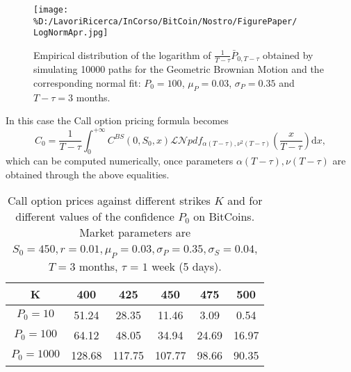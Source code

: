 \documentclass[12pt,centertags,reqno]{amsart}
\numberwithin{equation}{section} \makeatletter
\newcommand{\ud}{\mathrm d}
\begin{document}
\begin{figure}[htbp]
\texttt{[image: \%D:/LavoriRicerca/InCorso/BitCoin/Nostro/FigurePaper/
LogNormApr.jpg]} 
\caption{Empirical distribution of the logarithm of $\frac{1}{T-\tau} \bar{P}_{0,T-\tau}$  obtained by simulating 10000 paths for the Geometric Brownian Motion and the corresponding normal fit: $P_0=100$, $\mu_P=0.03$, $\sigma_P=0.35$ and  $T-\tau=3$ months. }\label{LNhistfit}
\end{figure}

In this case the Call option pricing formula becomes
\begin{equation}
C_0 = \frac{1}{T-\tau} \int_0^{+\infty}C^{BS}(0,S_0,x) \mathcal{LN} pdf_{\alpha(T-\tau),\nu^2(T-\tau)} \left(\frac{x}{T-\tau}\right) \ud x,  \label{callexample}
\end{equation}
which can be computed numerically, once parameters $\alpha(T-\tau),\nu(T-\tau)$ are obtained through the above equalities.


\begin{table}[tp]
\caption{Call option prices against different strikes $K$ and for different values of the confidence $P_0$ on BitCoins. Market parameters are $S_0=450,r=0.01,\mu_P=0.03,\sigma_P=0.35, \sigma_S=0.04$, $T=3$ months, $\tau$ = $1$ week (5 days).}
 \label{tab:prices}
 \centering
\begin{tabular}{||c|c|c|c|c|c||}
\hline 
K & 400 & 425 & 450 & 475 & 500 \\ 
\hline 
$P_0=10$ & 51.24 & 28.35 & 11.46 & 3.09 & 0.54 \\ 
\hline 
$P_0=100$ & 64.12 & 48.05 & 34.94 & 24.69 & 16.97 \\ 
\hline 
$P_0=1000$ & 128.68 & 117.75 & 107.77 & 98.66 & 90.35 \\ 
\hline
\end{tabular}
\end{table}
\end{document}
